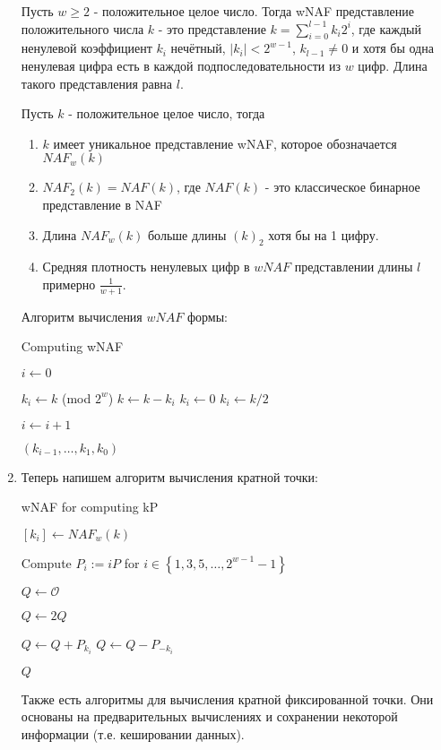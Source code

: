 \documentclass{article}
\begin{document}
\begin{enumerate}
      \begin{definition}
        Пусть $w\geqslant 2$ - положительное целое число. Тогда wNAF представление положительного числа $k$ - это представление $k=\sum_{i=0}^{l-1}k_i2^i$, где каждый ненулевой коэффициент $k_i$ нечётный, $|k_i|<2^{w-1}$, $k_{l-1}\neq 0$ и хотя бы одна ненулевая цифра есть в каждой подпоследовательности из $w$ цифр. Длина такого представления равна $l$. 
      \end{definition}
      \begin{theorem} Пусть $k$ - положительное целое число, тогда 
        \begin{enumerate}
          \item $k$ имеет уникальное представление wNAF, которое обозначается $NAF_w(k)$
          \item $NAF_2(k)=NAF(k)$, где $NAF(k)$ - это классическое бинарное представление в NAF 
          \item Длина $NAF_w(k)$ больше длины $(k)_2$ хотя бы на 1 цифру. 
          \item Средняя плотность ненулевых цифр в $wNAF$ представлении длины $l$ примерно $\frac{1}{w+1}$. 
        \end{enumerate}
      \end{theorem}
      Алгоритм вычисления $wNAF$ формы:

        \begin{algorithm}[H]
        \caption{Computing wNAF}
       $i\gets 0$

           {
             {
              $k_i\gets k$ (mod $2^w$)
              $k\gets k - k_i$
            } {
              $k_i\gets 0$
            }
            $k_i\gets k/2$

            $i\gets i+1$
          }
          \Return $(k_{i-1},\dots,k_1,k_0)$
      \end{algorithm}
      \item Теперь напишем алгоритм вычисления кратной точки:

        \begin{algorithm}[H]
        \caption{wNAF for computing kP}
          $[k_i]\gets NAF_w(k)$

          Compute $P_i:=iP$ for $i\in \left\{1,3,5,\dots,2^{w-1}-1\right\}$

          $Q\gets \mathcal{O}$

           {
            $Q\gets 2Q$

             {
               {
                $Q\gets Q + P_{k_i}$
              } {
                $Q\gets Q - P_{-{k_i}}$
              }
            }
          }
          \Return $Q$
      \end{algorithm}
      Также есть алгоритмы для вычисления кратной фиксированной точки. Они основаны на предварительных вычислениях и сохранении некоторой информации (т.е. кешировании данных).
    \end{enumerate}
\end{document}
